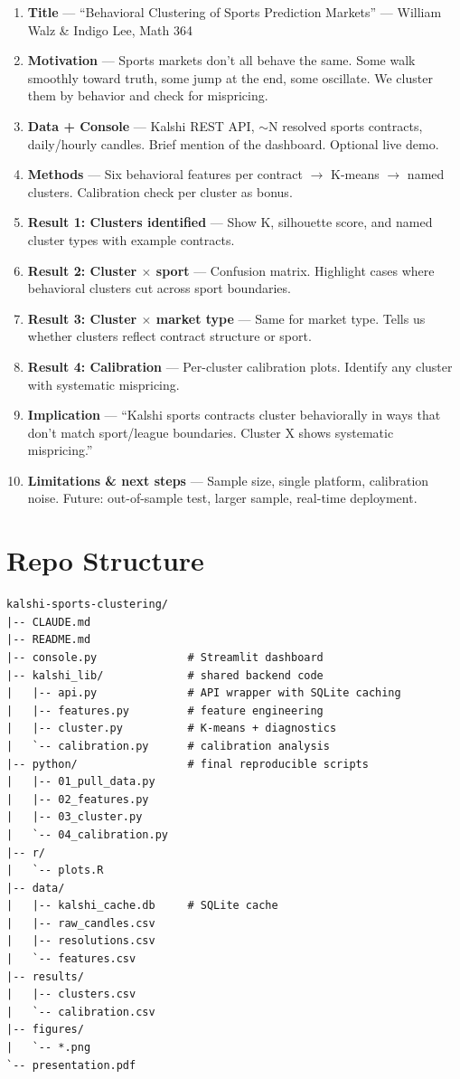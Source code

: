 \documentclass[11pt]{article}
\begin{document}
\begin{enumerate}[leftmargin=*, itemsep=0pt]
    \item \textbf{Title} --- ``Behavioral Clustering of Sports Prediction Markets'' --- William Walz \& Indigo Lee, Math 364
    \item \textbf{Motivation} --- Sports markets don't all behave the same. Some walk smoothly toward truth, some jump at the end, some oscillate. We cluster them by behavior and check for mispricing.
    \item \textbf{Data + Console} --- Kalshi REST API, $\sim$N resolved sports contracts, daily/hourly candles. Brief mention of the dashboard. Optional live demo.
    \item \textbf{Methods} --- Six behavioral features per contract $\to$ K-means $\to$ named clusters. Calibration check per cluster as bonus.
    \item \textbf{Result 1: Clusters identified} --- Show K, silhouette score, and named cluster types with example contracts.
    \item \textbf{Result 2: Cluster $\times$ sport} --- Confusion matrix. Highlight cases where behavioral clusters cut across sport boundaries.
    \item \textbf{Result 3: Cluster $\times$ market type} --- Same for market type. Tells us whether clusters reflect contract structure or sport.
    \item \textbf{Result 4: Calibration} --- Per-cluster calibration plots. Identify any cluster with systematic mispricing.
    \item \textbf{Implication} --- ``Kalshi sports contracts cluster behaviorally in ways that don't match sport/league boundaries. Cluster X shows systematic mispricing.''
    \item \textbf{Limitations \& next steps} --- Sample size, single platform, calibration noise. Future: out-of-sample test, larger sample, real-time deployment.
\end{enumerate}

\section{Repo Structure}

\begin{verbatim}
kalshi-sports-clustering/
|-- CLAUDE.md
|-- README.md
|-- console.py              # Streamlit dashboard
|-- kalshi_lib/             # shared backend code
|   |-- api.py              # API wrapper with SQLite caching
|   |-- features.py         # feature engineering
|   |-- cluster.py          # K-means + diagnostics
|   `-- calibration.py      # calibration analysis
|-- python/                 # final reproducible scripts
|   |-- 01_pull_data.py
|   |-- 02_features.py
|   |-- 03_cluster.py
|   `-- 04_calibration.py
|-- r/
|   `-- plots.R
|-- data/
|   |-- kalshi_cache.db     # SQLite cache
|   |-- raw_candles.csv
|   |-- resolutions.csv
|   `-- features.csv
|-- results/
|   |-- clusters.csv
|   `-- calibration.csv
|-- figures/
|   `-- *.png
`-- presentation.pdf
\end{verbatim}
\end{document}
